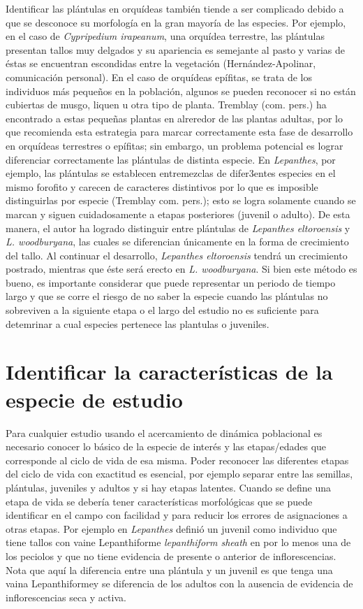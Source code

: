 \documentclass[
]{book}
\theoremstyle{definition}
\theoremstyle{definition}
\theoremstyle{definition}
\theoremstyle{definition}
\theoremstyle{remark}
\begin{document}
Identificar las plántulas en orquídeas también tiende a ser complicado debido a que se desconoce su morfología en la gran mayoría de las especies.
Por ejemplo, en el caso de \emph{Cypripedium irapeanum}, una orquídea terrestre, las plántulas presentan tallos muy delgados y su apariencia es semejante al pasto y varias de éstas se encuentran escondidas entre la vegetación (Hernández-Apolinar, comunicación personal).
En el caso de orquídeas epífitas, se trata de los individuos más pequeños en la población, algunos se pueden reconocer si no están cubiertas de musgo, liquen u otra tipo de planta.
Tremblay (com. pers.) ha encontrado a estas pequeñas plantas en alreredor de las plantas adultas, por lo que recomienda esta estrategia para marcar correctamente esta fase de desarrollo en orquídeas terrestres o epífitas; sin embargo, un problema potencial es lograr diferenciar correctamente las plántulas de distinta especie.
En \emph{Lepanthes}, por ejemplo, las plántulas se establecen entremezclas de difer3entes especies en el mismo forofito y carecen de caracteres distintivos por lo que es imposible distinguirlas por especie (Tremblay com. pers.); esto se logra solamente cuando se marcan y siguen cuidadosamente a etapas posteriores (juvenil o adulto).
De esta manera, el autor ha logrado distinguir entre plántulas de \emph{Lepanthes eltoroensis} y \emph{L. woodburyana}, las cuales se diferencian únicamente en la forma de crecimiento del tallo.
Al continuar el desarrollo, \emph{Lepanthes eltoroensis} tendrá un crecimiento postrado, mientras que éste será erecto en \emph{L. woodburyana}.
Si bien este método es bueno, es importante considerar que puede representar un periodo de tiempo largo y que se corre el riesgo de no saber la especie cuando las plántulas no sobreviven a la siguiente etapa o el largo del estudio no es suficiente para detemrinar a cual especies pertenece las plantulas o juveniles.

\section{Identificar la características de la especie de estudio}\label{identificar-la-caracteruxedsticas-de-la-especie-de-estudio}

Para cualquier estudio usando el acercamiento de dinámica poblacional es necesario conocer lo básico de la especie de interés y las etapas/edades que corresponde al ciclo de vida de esa misma.
Poder reconocer las diferentes etapas del ciclo de vida con exactitud es esencial, por ejemplo separar entre las semillas, plántulas, juveniles y adultos y si hay etapas latentes.
Cuando se define una etapa de vida se debería tener características morfológicas que se puede identificar en el campo con facilidad y para reducir los errores de asignaciones a otras etapas.
Por ejemplo en \emph{Lepanthes} \citep{tremblay2003population} definió un juvenil como individuo que tiene tallos con vaine Lepanthiforme \emph{lepanthiform sheath} en por lo menos una de los peciolos y que no tiene evidencia de presente o anterior de inflorescencias.
Nota que aquí la diferencia entre una plántula y un juvenil es que tenga una vaina Lepanthiformey se diferencia de los adultos con la ausencia de evidencia de inflorescencias seca y activa.
\end{document}
